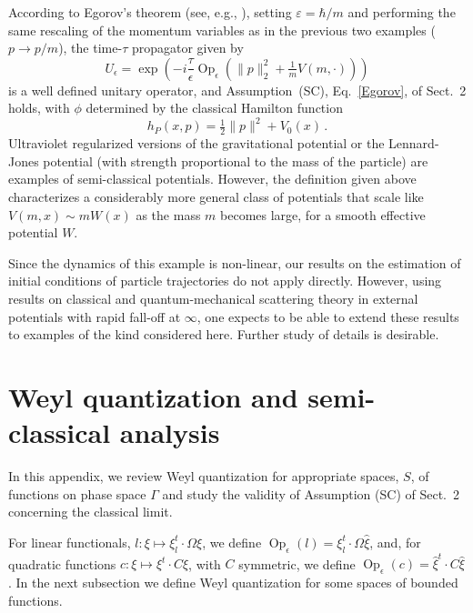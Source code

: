 \documentclass[11pt]{article}
\DeclareMathOperator{\Op}{Op}
\begin{document}
According to Egorov's theorem (see, e.g., \cite[Theorem 1.2]{BR}), setting $\varepsilon=\hbar/m$ and performing 
the same rescaling of the momentum variables as in the previous two examples ($p\to p/m$), 
the time-$\tau$ propagator given by
$$U_\epsilon=\exp\left(-i \frac{\tau}{\epsilon}\operatorname{Op}_\epsilon\left(\| p \|_2^2+\tfrac1{m}V(m,\cdot)\right)\right)$$
is a well defined unitary operator, and Assumption~(SC), Eq.~\eqref{Egorov}, of Sect.~2 holds, with $\phi$ 
determined by the classical Hamilton function
$$h_{P}(x,p) = \tfrac12\|p\|^2+V_0(x)\,.$$
Ultraviolet regularized versions of the gravitational potential or the Lennard-Jones potential (with strength proportional 
to the mass of the particle) are examples of semi-classical potentials. However, the definition given above characterizes 
a considerably more general class of potentials that scale like $V(m,x)\sim mW(x)$ as the mass $m$ becomes large, for 
a smooth effective potential $W$. 

Since the dynamics of this example is non-linear, our results on the estimation of initial conditions of particle trajectories 
do not apply directly. However, using results on classical and quantum-mechanical scattering theory in 
external potentials with rapid fall-off at $\infty$, one expects to be able to extend these results to examples 
of the kind considered here. Further study of details is desirable.

\appendix

\section{Weyl quantization and semi-classical analysis}\label{app:semi-classical}
In this appendix, we review Weyl quantization for appropriate spaces, $S$, of functions on phase space $\Gamma$ 
and study the validity of Assumption (SC) of Sect.~2 concerning the classical limit.

For linear functionals, $l:\xi\mapsto \xi_l^{t}\cdot \Omega \xi$, we define $\Op_\epsilon(l)=\xi_l^{t}\cdot \Omega \hat \xi$, and, for quadratic functions 
$c:\xi\mapsto \xi^{t}\cdot C\xi$, with $C$ symmetric, we define $\Op_\epsilon(c)=\hat{\xi}^{t}\cdot C \hat\xi$.
In the next subsection we define Weyl quantization for some spaces of bounded functions.
\end{document}
